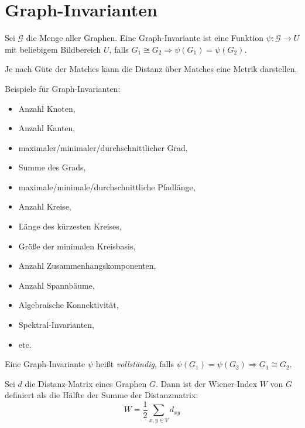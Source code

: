 \chapter{Graph-Invarianten}

\begin{definition}
    Sei $ \mathcal{G} $ die Menge aller Graphen.
    Eine Graph-Invariante ist eine Funktion $ \psi: \mathcal G \rightarrow U $ mit beliebigem Bildbereich $ U $, falls $ G_1 \cong G_2 \Rightarrow \psi(G_1) = \psi(G_2) $.
\end{definition}

\begin{remark}
    Je nach Güte der Matches kann die Distanz über Matches eine Metrik darstellen.
\end{remark}

\begin{example}
    Beispiele für Graph-Invarianten:
    \begin{itemize}
        \item Anzahl Knoten,
        \item Anzahl Kanten,
        \item maximaler/minimaler/durchschnittlicher Grad,
        \item Summe des Grads,
        \item maximale/minimale/durchschnittliche Pfadlänge,
        \item Anzahl Kreise,
        \item Länge des kürzesten Kreises,
        \item Größe der minimalen Kreisbasis,
        \item Anzahl Zusammenhangskomponenten,
        \item Anzahl Spannbäume,
        \item Algebraische Konnektivität,
        \item Spektral-Invarianten,
        \item etc.
    \end{itemize}
\end{example}

\begin{definition}[Vollständig]
    Eine Graph-Invariante $ \psi $ heißt \textit{vollständig}, falls $ \psi(G_1) = \psi(G_2) \Rightarrow G_1 \cong G_2 $.
\end{definition}

\begin{definition}
    Sei $ d $ die Distanz-Matrix eines Graphen $ G $.
    Dann ist der Wiener-Index $ W $ von $ G $ definiert als die Hälfte der Summe der Distanzmatrix:
    \begin{equation*}
        W = \frac{1}{2} \sum_{x, y \in V} d_{xy}
    \end{equation*}
\end{definition}

